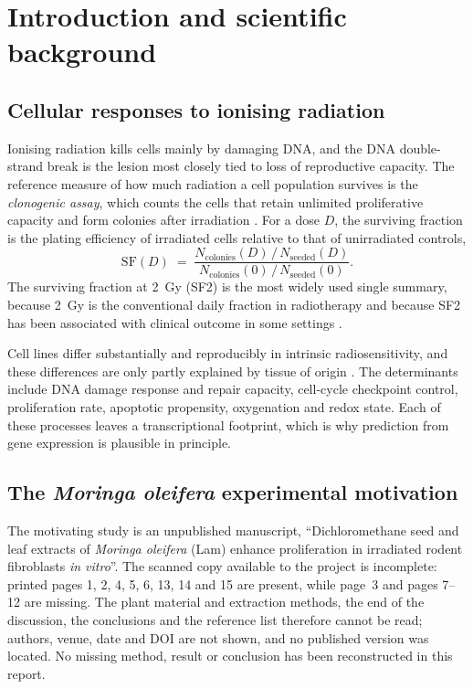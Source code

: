 \chapter{Introduction and scientific background}\label{ch:introduction}

\section{Cellular responses to ionising radiation}

Ionising radiation kills cells mainly by damaging DNA, and the DNA double-strand break is
the lesion most closely tied to loss of reproductive capacity. The reference measure of how
much radiation a cell population survives is the \emph{clonogenic assay}, which counts the
cells that retain unlimited proliferative capacity and form colonies after irradiation
\parencite{puck1956}. For a dose $D$, the surviving fraction is the plating efficiency of
irradiated cells relative to that of unirradiated controls,
\begin{equation}
  \mathrm{SF}(D) \;=\; \frac{N_{\text{colonies}}(D)\,/\,N_{\text{seeded}}(D)}
                             {N_{\text{colonies}}(0)\,/\,N_{\text{seeded}}(0)} .
  \label{eq:sf}
\end{equation}
The surviving fraction at 2~Gy (SF2) is the most widely used single summary, because 2~Gy
is the conventional daily fraction in radiotherapy and because SF2 has been associated with
clinical outcome in some settings \parencite{fertil1981,west1993}.

Cell lines differ substantially and reproducibly in intrinsic radiosensitivity, and these
differences are only partly explained by tissue of origin \parencite{yard2016}. The
determinants include DNA damage response and repair capacity, cell-cycle checkpoint
control, proliferation rate, apoptotic propensity, oxygenation and redox state. Each of
these processes leaves a transcriptional footprint, which is why prediction from gene
expression is plausible in principle.

\section{The \textit{Moringa oleifera} experimental motivation}\label{sec:moringa-study}

The motivating study is an unpublished manuscript, \enquote{Dichloromethane seed and leaf
extracts of \textit{Moringa oleifera} (Lam) enhance proliferation in irradiated rodent
fibroblasts \textit{in vitro}}. The scanned copy available to the project is incomplete:
printed pages 1, 2, 4, 5, 6, 13, 14 and 15 are present, while page~3 and pages 7--12 are
missing. The plant material and extraction methods, the end of the discussion, the
conclusions and the reference list therefore cannot be read; authors, venue, date and DOI
are not shown, and no published version was located. No missing method, result or
conclusion has been reconstructed in this report.

